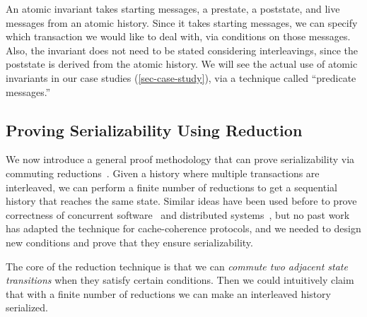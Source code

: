 \documentclass[sigplan,10pt,review,anonymous,screen]{acmart}\settopmatter{printfolios=true,printccs=false,printacmref=false}
\begin{document}
An atomic invariant takes starting messages, a prestate, a poststate, and live messages from an atomic history.
Since it takes starting messages, we can specify which transaction we would like to deal with, via conditions on those messages.
Also, the invariant does not need to be stated considering interleavings, since the poststate is derived from the atomic history.
We will see the actual use of atomic invariants in our case studies (\autoref{sec-case-study}), via a technique called ``predicate messages.''

\subsection{Proving Serializability Using Reduction}

We now introduce a general proof methodology that can prove serializability via commuting reductions~\cite{reduction}.
Given a history where multiple transactions are interleaved, we can perform a finite number of reductions to get a sequential history that reaches the same state.
Similar ideas have been used before to prove correctness of concurrent software~\cite{Chajed:2018} and distributed systems~\cite{Hawblitzel:2015,Hawblitzel:2017}, but no past work has adapted the technique for cache-coherence protocols, and we needed to design new conditions and prove that they ensure serializability.

The core of the reduction technique is that we can \emph{commute two adjacent state transitions} when they satisfy certain conditions.
Then we could intuitively claim that with a finite number of reductions we can make an interleaved history serialized.
\end{document}
